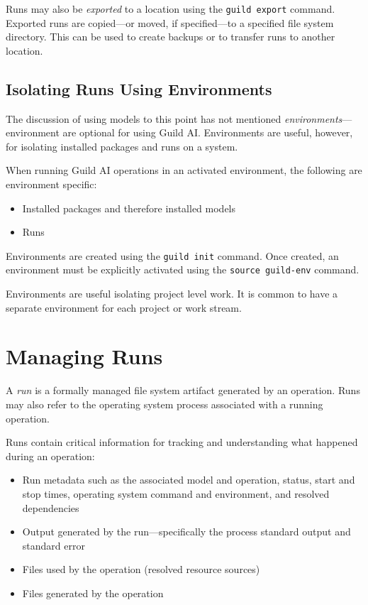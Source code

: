 \documentclass{article}
\begin{document}
Runs may also be \emph{exported} to a location using the
\verb|guild export| command. Exported runs are copied---or moved, if
specified---to a specified file system directory. This can be used to
create backups or to transfer runs to another location.

\subsection{Isolating Runs Using Environments}

The discussion of using models to this point has not mentioned
\emph{environments}---environment are optional for using Guild
AI. Environments are useful, however, for isolating installed packages
and runs on a system.

When running Guild AI operations in an activated environment, the
following are environment specific:

\begin{itemize}
\item Installed packages and therefore installed models
\item Runs
\end{itemize}

Environments are created using the \verb|guild init| command. Once
created, an environment must be explicitly activated using the
\verb|source guild-env| command.

Environments are useful isolating project level work. It is common to
have a separate environment for each project or work stream.

\section{Managing Runs}
\label{sec:runs}

A \emph{run} is a formally managed file system artifact generated by
an operation. Runs may also refer to the operating system process
associated with a running operation.

Runs contain critical information for tracking and understanding what
happened during an operation:

\begin{itemize}
\item Run metadata such as the associated model and operation, status,
  start and stop times, operating system command and environment, and
  resolved dependencies
\item Output generated by the run---specifically the process standard
  output and standard error
\item Files used by the operation (resolved resource sources)
\item Files generated by the operation
\end{itemize}
\end{document}
